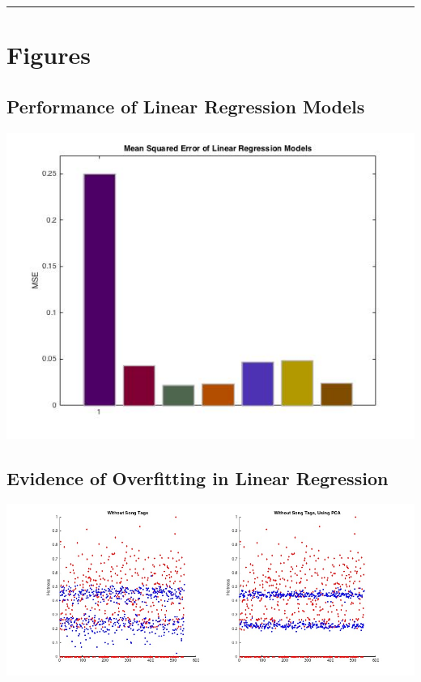 \documentclass[12pt]{article}
\newcommand{\horizontalLine}{
	\begin{center}
		\hrule width 1.0\textwidth
	\end{center}
}
\begin{document}
\appendix

\horizontalLine
\section{Figures}
\label{sec:figures}

\subsection{Performance of Linear Regression Models}
\label{subsec:MSE}
\includegraphics[scale=.5]{images/lr/mse}

\subsection{Evidence of Overfitting in Linear Regression}
\label{subsec:overfitting}
\includegraphics[scale=.4]{images/lr/overfit}
\end{document}
